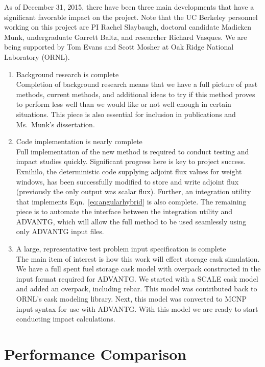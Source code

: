 \documentclass[12pt]{article}
\begin{document}
As of December 31, 2015, there have been three main developments that have a significant favorable impact on the project. Note that 
the UC Berkeley personnel working on this project are PI Rachel Slaybaugh, doctoral candidate Madicken Munk, undergraduate Garrett Baltz, and researcher Richard Vasques. We are being supported by Tom Evans and Scott Mosher at Oak Ridge National Laboratory (ORNL). 
\begin{enumerate}
\item Background research is complete\\
Completion of background research means that we have a full picture of past methods, current methods, and additional ideas to try if this method proves to perform less well than we would like or not well enough in certain situations.
This piece is also essential for inclusion in publications and Ms.\ Munk's dissertation.
 
\item Code implementation is nearly complete\\
Full implementation of the new method is required to conduct testing and impact studies quickly. 
Significant progress here is key to project success.
Exnihilo, the deterministic code supplying adjoint flux values for weight windows, has been successfully modified to store and write adjoint flux (previously the only output was scalar flux). 
Further, an integration utility that implements Eqn.~\eqref{eq:angularhybrid} is also complete. 
The remaining piece is to automate the interface between the integration utility and ADVANTG, which will allow the full method to be used seamlessly using only ADVANTG input files. 

\item A large, representative test problem input specification is complete\\
The main item of interest is how this work will effect storage cask simulation. 
We have a full spent fuel storage cask model with overpack constructed in the input format required for ADVANTG. 
We started with a SCALE cask model and added an overpack, including rebar. 
This model was contributed back to ORNL's cask modeling library. 
Next, this model was converted to MCNP input syntax for use with ADVANTG.
With this model we are ready to start conducting impact calculations.
\end{enumerate}


\section{Performance Comparison}
\label{sect::perf-comp} 
\end{document}
